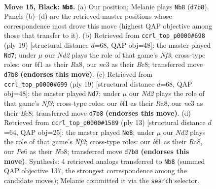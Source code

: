 \documentclass[11pt]{article}
\begin{document}
\clearpage

\begin{figure}[p]\centering
\begin{subfigure}{0.46\textwidth}\centering
\resizebox{\linewidth}{!}{%
\newchessgame
\chessboard[
  setfen={2b1qrk1/r1pnnppp/1p2p3/p2pP3/3P1P2/2N3K1/PPP3PP/R2Q1BNR b - - 1 15},
  showmover=false,
  pgfstyle=straightmove, color=movearrow, markmove={d7-b8}
]}
\caption{}
\end{subfigure}\hfill
\begin{subfigure}{0.46\textwidth}\centering
\resizebox{\linewidth}{!}{%
\newchessgame
\chessboard[
  setfen={r1bq1rk1/ppp2p1p/n2p1np1/3Pp3/2P1P3/1NN4P/PP3PP1/R1Q1KB1R b KQ - 0 10},
  showmover=false,
  pgfstyle=straightmove, color=movearrow, markmove={f6-d7}
]}
\caption{}
\end{subfigure}
\\[4pt]
\begin{subfigure}{0.46\textwidth}\centering
\resizebox{\linewidth}{!}{%
\newchessgame
\chessboard[
  setfen={r1bq1rk1/ppp2p1p/n2p1np1/3Pp3/2P1P3/1NN4P/PP3PP1/R1Q1KB1R b KQ - 0 10},
  showmover=false,
  pgfstyle=straightmove, color=movearrow, markmove={f6-d7}
]}
\caption{}
\end{subfigure}\hfill
\begin{subfigure}{0.46\textwidth}\centering
\resizebox{\linewidth}{!}{%
\newchessgame
\chessboard[
  setfen={rnbq1rk1/pp1p1ppp/4pn2/2p5/2PPP3/P1P2P2/6PP/R1BQKBNR b KQ - 0 7},
  showmover=false,
  pgfstyle=straightmove, color=movearrow, markmove={f6-e8}
]}
\caption{}
\end{subfigure}
\caption{\textbf{Move 15, Black: \texttt{Nb8}.} (a) Our position; Melanie plays \texttt{Nb8} (\texttt{d7b8}). Panels (b)--(d) are the retrieved master positions whose correspondence most drove this move (highest QAP objective among those that transfer to it). (b) Retrieved from \texttt{ccrl\_top\_p0000\#698} (ply 19) [structural distance $d$=68, QAP obj=48]: the master played \texttt{Nd7}; under $\mu$ our \emph{Nd2} plays the role of that game's \emph{Nf3}; cross-type roles: our \emph{b}f1 as their \emph{R}a8, our \emph{n}c3 as their \emph{B}c8; transferred move \texttt{d7b8} \textbf{(endorses this move)}. (c) Retrieved from \texttt{ccrl\_top\_p0000\#699} (ply 19) [structural distance $d$=68, QAP obj=48]: the master played \texttt{Nd7}; under $\mu$ our \emph{Nd2} plays the role of that game's \emph{Nf3}; cross-type roles: our \emph{b}f1 as their \emph{R}a8, our \emph{n}c3 as their \emph{B}c8; transferred move \texttt{d7b8} \textbf{(endorses this move)}. (d) Retrieved from \texttt{ccrl\_top\_p0000\#1589} (ply 13) [structural distance $d$=64, QAP obj=25]: the master played \texttt{Ne8}; under $\mu$ our \emph{Nd2} plays the role of that game's \emph{Nf3}; cross-type roles: our \emph{b}f1 as their \emph{R}a8, our \emph{P}e6 as their \emph{N}b8; transferred move \texttt{d7b8} \textbf{(endorses this move)}. Synthesis: 4 retrieved analogs transferred to \texttt{Nb8} (summed QAP objective 137, the strongest correspondence among the candidate moves); Melanie committed it via the \texttt{search} selector.}
\label{fig:thought-m29}
\end{figure}
\end{document}
